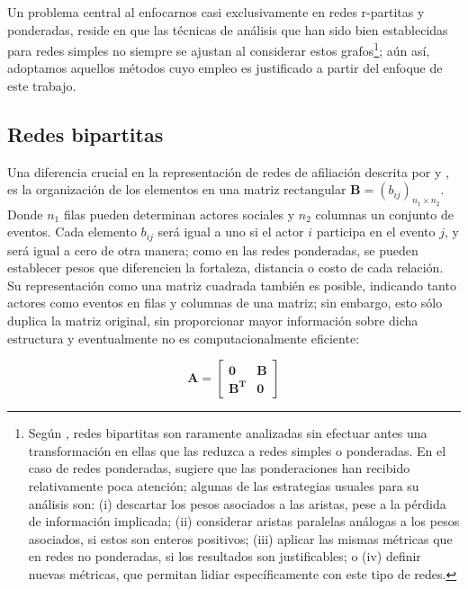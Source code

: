 \documentclass[letterpaper, 11pt]{book}
\theoremstyle{definition}
\theoremstyle{remark}
\begin{document}
Un problema central al enfocarnos casi exclusivamente en redes r-partitas y ponderadas, reside en que las técnicas de análisis que han sido bien establecidas para redes simples no siempre se ajustan al considerar estos grafos\footnote{
    Según \citet{2013_Opsahl_BipartiteCluster}, redes bipartitas son raramente analizadas sin efectuar antes una transformación en ellas que las reduzca a redes simples o ponderadas. 
    En el caso de redes ponderadas, \citet{2004_Newman_WeightedNet} sugiere que las ponderaciones han recibido relativamente poca atención; algunas de las estrategias usuales para su análisis son: 
    (i) descartar los pesos asociados a las aristas, pese a la pérdida de información implicada; 
    (ii) considerar aristas paralelas análogas a los pesos asociados, si estos son enteros positivos; 
    (iii) aplicar las mismas métricas que en redes no ponderadas, si los resultados son justificables; 
    o (iv) definir nuevas métricas, que permitan lidiar específicamente con este tipo de redes.
}; 
aún así, adoptamos aquellos métodos cuyo empleo es justificado a partir del enfoque de este trabajo.




\subsection{Redes bipartitas}
\label{subsec:redesBipartitas}

Una diferencia crucial en la representación de redes de afiliación descrita por \citet{1988_Breiger_Bipartite} y \citet{1994_Wasserman_SNA}, es la organización de los elementos en una matriz rectangular $\mathbf{B} = (b_{ij})_{n_{1} \times n_{2}}$. 
Donde $n_{1}$ filas pueden determinan actores sociales y $n_{2}$ columnas un conjunto de eventos. 
Cada elemento $b_{ij}$ será igual a uno si el actor $i$ participa en el evento $j$, y será igual a cero de otra manera; como en las redes ponderadas, se pueden establecer pesos que diferencien la fortaleza, distancia o costo de cada relación. 
Su representación como una matriz cuadrada también es posible, indicando tanto actores como eventos en filas y columnas de una matriz; sin embargo, esto sólo duplica la matriz original, sin proporcionar mayor información sobre dicha estructura y eventualmente no es computacionalmente eficiente:

\begin{equation}\label{eq:matriz_bipartita}
\mathbf{A} =     
\left[
\begin{matrix}
\mathbf{0} & \mathbf{B} \\
\mathbf{B^{T}} & \mathbf{0}
\end{matrix}
\right]
\end{equation} 
\end{document}
